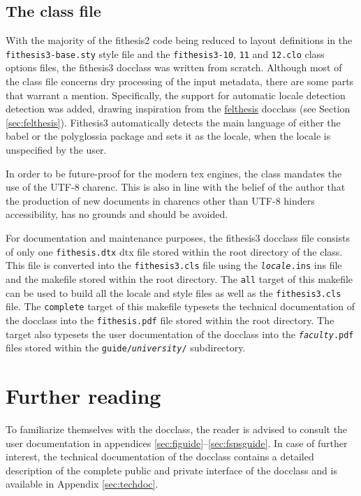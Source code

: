 \documentclass[12pt,twoside,color,table]%
  {fithesis3/fithesis3/fithesis3} %
\begin{document}
  \subsection{The class file}
  With the majority of the \textsf{fithesis2} code being reduced to
  layout definitions in the \texttt{fithesis3-base.sty} style file
  and the \texttt{fithesis3-10}, \texttt{11} and \texttt{12.clo}
  class options files, the \textsf{fithesis3} \gls{docclass} was
  written from scratch. Although most of the class file concerns
  dry processing of the input metadata, there are some parts that
  warrant a mention. Specifically, the support for automatic locale
  detection detection was added, drawing inspiration from the
  \hyperref[sec:felthesis]{\textsf{felthesis}} \gls{docclass} (see
  Section \ref{sec:felthesis}). \textsf{Fithesis3} automatically
  detects the main language of either the \textsf{babel} or the
  \textsf{polyglossia} package and sets it as the locale, when the
  locale is unspecified by the user.

  In order to be future-proof for the modern \gls{tex} engines, the
  class mandates the use of the UTF-8 \gls{charenc}. This is also
  in line with the belief of the author that the production of new
  documents in \glspl{charenc} other than UTF-8 hinders
  accessibility, has no grounds and should be avoided.

  For documentation and maintenance purposes, the
  \textsf{fithesis3} \gls{docclass} file consists of only one
  \texttt{fithesis.dtx} \gls{dtx} file stored within the root
  directory of the class. This file is converted into the
  \texttt{fithesis3.cls} file using the
  \texttt{\textit{locale}.ins} \gls{ins} file and the
  \gls{makefile} stored within the root directory. The \texttt{all}
  target of this \gls{makefile} can be used to build all the locale
  and style files as well as the \texttt{fithesis3.cls} file. The
  \texttt{complete} target of this \gls{makefile} typesets the
  technical documentation of the \gls{docclass} \cite{novotny15}
  into the \texttt{fithesis.pdf} file stored within the root
  directory. The target also typesets the user documentation of the
  \gls{docclass} into the \texttt{\textit{faculty}.pdf} files
  stored within the \texttt{guide/\textit{university}/}
  subdirectory.

  \section{Further reading}
  To familiarize themselves with the \gls{docclass}, the reader
  is advised to consult the user documentation in appendices
  \ref{sec:figuide}--\ref{sec:fspsguide}. In case of further
  interest, the technical documentation of the \gls{docclass}
  contains a detailed description of the complete public and
  private interface of the \gls{docclass} and is available in
  Appendix \ref{sec:techdoc}. 
\end{document}
